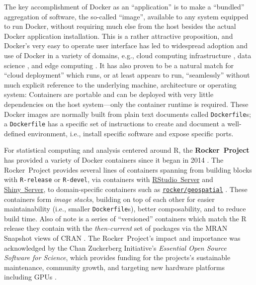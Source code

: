 The key accomplishment of Docker as an ``application'' is to make a
``bundled'' aggregation of software, the so-called ``image'', available
to any system equipped to run Docker, without requiring much else from
the host besides the actual Docker application installation. This is a
rather attractive proposition, and Docker's very easy to operate user
interface has led to widespread adoption and use of Docker in a variety
of domains, e.g., cloud computing infrastructure
\citep[e.g.,][]{Bernstein2014}, data science
\citep[e.g.,][]{boettiger_introduction_2015}, and edge computing
\citep[e.g.,][]{alam_orchestration_2018}. It has also proven to be a
natural match for ``cloud deployment'' which runs, or at least appears
to run, ``seamlessly'' without much explicit reference to the underlying
machine, architecture or operating system: Containers are portable and
can be deployed with very little dependencies on the host system---only
the container runtime is required. These Docker images are normally
built from plain text documents called \texttt{Dockerfile}s; a
\texttt{Dockerfile} has a specific set of instructions to create and
document a well-defined environment, i.e., install specific software and
expose specific ports.

For statistical computing and analysis centered around R, the
\textbf{Rocker~Project} has provided a variety of Docker containers
since it began in 2014 \citep{RJ-2017-065}. The Rocker~Project provides
several lines of containers spanning from building blocks with
\texttt{R-release} or \texttt{R-devel}, via containers with
\href{https://rstudio.com/products/rstudio/}{RStudio~Server} and
\href{https://rstudio.com/products/shiny/shiny-server/}{Shiny~Server},
to domain-specific containers such as
\href{https://github.com/rocker-org/geospatial}{\texttt{rocker/geospatial}}
\citep{rocker_geospatial_2019}. These containers form \emph{image
stacks}, building on top of each other for easier maintainability (i.e.,
smaller \texttt{Dockerfile}s), better composability, and to reduce build
time. Also of note is a series of ``versioned'' containers which match
the R release they contain with the \emph{then-current} set of packages
via the MRAN Snapshot views of CRAN \citep{microsoft_cran_2019}. The
Rocker~Project's impact and importance was acknowledged by the Chan
Zuckerberg Initiative's \emph{Essential Open Source Software for
Science}, which provides funding for the projects's sustainable
maintenance, community growth, and targeting new hardware platforms
including GPUs \citep{chan_zuckerberg_initiative_maintaining_2019}.

